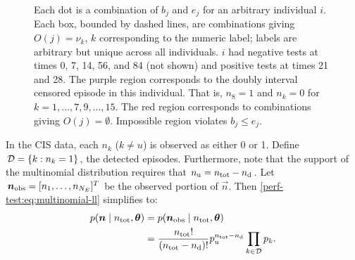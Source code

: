 \documentclass[thesis.tex]{subfiles}
\begin{document}
\begin{figure}
\caption[Episode regions]{%
  Each dot is a combination of $b_j$ and $e_j$ for an arbitrary individual $i$.
  Each box, bounded by dashed lines, are combinations giving $O(j) = \nu_k$, $k$ corresponding to the numeric label; labels are arbitrary but unique across all individuals.
  $i$ had negative tests at times 0, 7, 14, 56, and 84 (not shown) and positive tests at times 21 and 28.
  The purple region corresponds to the doubly interval censored episode in this individual.
  That is, $n_8 = 1$ and $n_k = 0$ for $k = 1, \dots, 7, 9, \dots, 15$.
  The red region corresponds to combinations giving $O(j) = \emptyset$.
  Impossible region violates $b_j \leq e_j$.
}
\label{perf-test:fig:partitionSpace}
\end{figure}

In the CIS data, each $n_k$ ($k \neq u$) is observed as either 0 or 1.
Define $\mathcal{D} = \{ k : n_k = 1 \}$, the detected episodes.
Furthermore, note that the support of the multinomial distribution requires that $n_\text{u} = n_\text{tot} - n_\text{d}$.
Let $\bm{n}_\text{obs} = [n_{1}, \dots, n_{N_E}]^T$ be the observed portion of $\vec{n}$.
Then \cref{perf-test:eq:multinomial-ll} simplifies to:
\begin{align}
  p(\bm{n} \mid n_\text{tot}, \bm{\theta})
  &= p(\bm{n}_\text{obs} \mid n_\text{tot}, \bm{\theta}) \\
  &= \frac{n_\text{tot}!}{(n_\text{tot} - n_\text{d})!} p_u^{n_\text{tot}-n_\text{d}} \prod_{k \in \mathcal{D}} p_k.
  \label{perf-test:eq:multinomial}
\end{align}
\end{document}

